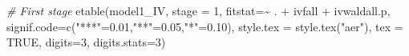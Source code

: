 \documentclass[
]{article}
\newenvironment{Shaded}{\begin{snugshade}}{\end{snugshade}}
\newcommand{\AttributeTok}[1]{\textcolor[rgb]{0.77,0.63,0.00}{#1}}
\newcommand{\CommentTok}[1]{\textcolor[rgb]{0.56,0.35,0.01}{\textit{#1}}}
\newcommand{\ConstantTok}[1]{\textcolor[rgb]{0.00,0.00,0.00}{#1}}
\newcommand{\DecValTok}[1]{\textcolor[rgb]{0.00,0.00,0.81}{#1}}
\newcommand{\FloatTok}[1]{\textcolor[rgb]{0.00,0.00,0.81}{#1}}
\newcommand{\FunctionTok}[1]{\textcolor[rgb]{0.00,0.00,0.00}{#1}}
\newcommand{\NormalTok}[1]{#1}
\newcommand{\OtherTok}[1]{\textcolor[rgb]{0.56,0.35,0.01}{#1}}
\newcommand{\SpecialCharTok}[1]{\textcolor[rgb]{0.00,0.00,0.00}{#1}}
\newcommand{\StringTok}[1]{\textcolor[rgb]{0.31,0.60,0.02}{#1}}
\begin{document}
\begin{Shaded}
\begin{Highlighting}[]
\CommentTok{\# First stage}
\FunctionTok{etable}\NormalTok{(model1\_IV, }\AttributeTok{stage =} \DecValTok{1}\NormalTok{, }\AttributeTok{fitstat=}\SpecialCharTok{\textasciitilde{}}\NormalTok{ . }\SpecialCharTok{+}\NormalTok{ ivfall }\SpecialCharTok{+}\NormalTok{ ivwaldall.p,}
       \AttributeTok{signif.code=}\FunctionTok{c}\NormalTok{(}\StringTok{"***"}\OtherTok{=}\FloatTok{0.01}\NormalTok{,}\StringTok{"**"}\OtherTok{=}\FloatTok{0.05}\NormalTok{,}\StringTok{"*"}\OtherTok{=}\FloatTok{0.10}\NormalTok{), }
       \AttributeTok{style.tex =} \FunctionTok{style.tex}\NormalTok{(}\StringTok{"aer"}\NormalTok{),  }\AttributeTok{tex =} \ConstantTok{TRUE}\NormalTok{,}
       \AttributeTok{digits=}\DecValTok{3}\NormalTok{, }\AttributeTok{digits.stats=}\DecValTok{3}\NormalTok{)}
\end{Highlighting}
\end{Shaded}
\end{document}
